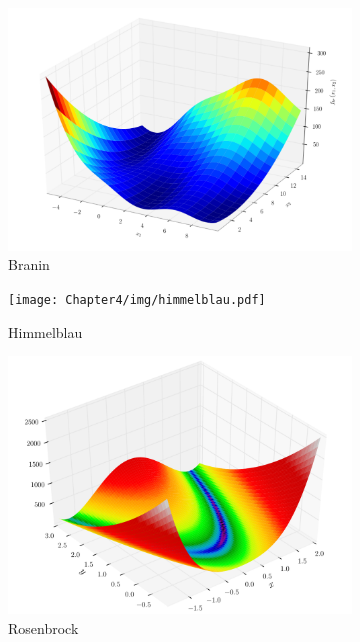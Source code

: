 \begin{figure}[ht]
  \centering
  \begin{subfigure}{0.24\textwidth}
    \centering\includegraphics[width=\textwidth]{Chapter4/img/branin.pdf}
    \caption{Branin}
  \end{subfigure}
  \begin{subfigure}{0.24\textwidth}
    \centering\texttt{[image: Chapter4/img/himmelblau.pdf]}
    \caption{Himmelblau}
  \end{subfigure}
  \begin{subfigure}{0.24\textwidth}
    \centering\includegraphics[width=\textwidth]{Chapter4/img/rosenbrock.pdf}
    \caption{Rosenbrock}
  \end{subfigure}
  \begin{subfigure}{0.24\textwidth}

\end{subfigure}
\end{figure}
